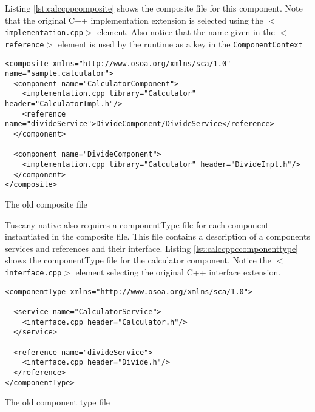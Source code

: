 Listing \ref{lst:calccppcomposite} shows the composite file for this component. Note that
the original C++ implementation extension is selected using the \texttt{$<$implementation.cpp$>$}
element. Also notice that the name given in the \texttt{$<$reference$>$} element is used by
the runtime as a key in the \texttt{ComponentContext}

\begin{listing}
\begin{verbatim}
<composite xmlns="http://www.osoa.org/xmlns/sca/1.0" name="sample.calculator">
  <component name="CalculatorComponent">
    <implementation.cpp library="Calculator" header="CalculatorImpl.h"/>
    <reference name="divideService">DivideComponent/DivideService</reference>
  </component>
        
  <component name="DivideComponent">
    <implementation.cpp library="Calculator" header="DivideImpl.h"/>
  </component>
</composite>
\end{verbatim}
\caption{The old composite file}
\label{lst:calccppcomposite}
\end{listing}

Tuscany native also requires a componentType file for each component instantiated in the composite file.
This file contains a description of a components services and references and their interface. Listing
\ref{lst:calccppccomponenttype} shows the componentType file for the calculator component. Notice
the \texttt{$<$interface.cpp$>$} element selecting the original C++ interface extension.

\begin{listing}
\begin{verbatim}
<componentType xmlns="http://www.osoa.org/xmlns/sca/1.0">

  <service name="CalculatorService">
    <interface.cpp header="Calculator.h"/>
  </service>

  <reference name="divideService">
    <interface.cpp header="Divide.h"/>
  </reference>
</componentType>
\end{verbatim}
\caption{The old component type file}
\label{lst:calccppccomponenttype}
\end{listing}

